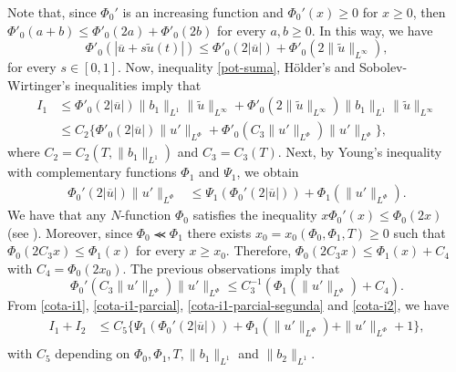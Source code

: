 \documentclass[twoside]{elsarticle}
\theoremstyle{remark}
\newcommand{\orlnor}{\|_{L^{\Phi}}}
\renewcommand{\leq}{\leqslant}
\renewcommand{\geq}{\geqslant}
\begin{document}
Note that, since $\Phi_0'$ is an increasing function  and $\Phi_0'(x)\geq 0$ for $x\geq 0$, then
$\Phi'_0(a+b)\leq \Phi'_0(2a)+\Phi'_0(2b)$ for every $a,b\geq 0$.
In this way, we have
\begin{equation}\label{pot-suma}
\Phi'_0(|\overline{u}+s\tilde{u}(t)|)\leq
\Phi'_0(2|\overline{u}|)+\Phi'_0(2\|\tilde{u}\|_{L^{\infty}}),
\end{equation}
for every $s \in [0,1]$.  Now,  inequality \eqref{pot-suma}, H\"older's and Sobolev-Wirtinger's inequalities imply that
\begin{equation}\label{cota-i1}
\begin{split}
I_1&
\leq \Phi'_0(2|\overline{u}|) \|b_1\|_{L^1} \|\tilde{u}\|_{L^{\infty}}+\Phi'_0(2\|\tilde{u}\|_{L^\infty})
 \|b_1\|_{L^1}\|\tilde{u}\|_{L^\infty}
\\
&\leq C_2 \bigg\{ \Phi'_0(2|\overline{u}|) \|u'\orlnor
+\Phi'_0(C_3\|u'\orlnor) \|u'\orlnor\bigg\},
\end{split}
\end{equation}
where $C_2=C_2(T, \|b_1\|_{L^1} )$ and $C_3=C_3(T)$. 
Next, by Young's inequality with complementary functions $\Phi_1$ and $\Psi_1$, we obtain
%
\begin{equation}\label{cota-i1-parcial}
 \begin{split}
\Phi_0'(2|\overline{u}|) \|u'\orlnor
&\leq 
\Psi_1(\Phi_0'(2|\overline{u}|))+
\Phi_1(\|u'\orlnor).
\end{split}
\end{equation}
%
We have that any $N$-function $\Phi_0$ satisfies the inequality $x\Phi_0'(x)\leq \Phi_0(2x)$ (see \cite[p. 17]{rao1991theory}). 
Moreover, since $\Phi_0\llcurly\Phi_1$ there exists $x_0=x_0(\Phi_0,\Phi_1,T)\geq 0$ such that $\Phi_0(2C_3x)\leq \Phi_1(x)$
for every $x\geq x_0$. Therefore, $\Phi_0(2C_3x)\leq \Phi_1(x)+C_4$ with $C_4=\Phi_0(2x_0)$. The previous observations imply that
\begin{equation}\label{cota-i1-parcial-segunda}
\Phi_0'(C_3\|u'\orlnor) \|u'\orlnor
\leq 
C_3^{-1}(\Phi_1(\|u'\orlnor)+C_4).
\end{equation}
From \eqref{cota-i1}, \eqref{cota-i1-parcial}, \eqref{cota-i1-parcial-segunda} and \eqref{cota-i2}, we have
\begin{equation}\label{cota-i1-i2}
\begin{split}
I_1+I_2
&
\leq C_5
\bigg\{ 
\Psi_1(\Phi_0'(2|\overline{u}|))
+\Phi_1(\|u'\orlnor)
+\|u'\orlnor +1
\bigg\},\\
\end{split}
\end{equation}
with $C_5$ depending on $\Phi_0, \Phi_1, T, \|b_1\|_{L^1}$ and $\|b_2\|_{L^1} $.
\end{document}
